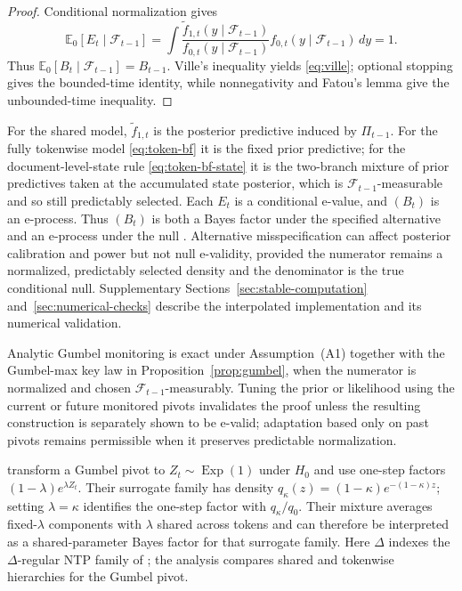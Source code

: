\documentclass[11pt]{article}
\newcommand{\E}{\mathbb E}
\newcommand{\F}{\mathcal F}
\begin{document}
\begin{proof}
Conditional normalization gives
\[
  \E_0[E_t\mid\F_{t-1}]
  =\int\frac{\widetilde f_{1,t}(y\mid\F_{t-1})}
  {f_{0,t}(y\mid\F_{t-1})}f_{0,t}(y\mid\F_{t-1})\,dy=1.
\]
Thus $\E_0[B_t\mid\F_{t-1}]=B_{t-1}$.  Ville's inequality yields \eqref{eq:ville}; optional stopping gives the bounded-time identity, while nonnegativity and Fatou's lemma give the unbounded-time inequality.
\end{proof}

For the shared model, $\widetilde f_{1,t}$ is the posterior predictive induced by $\Pi_{t-1}$.  For the fully tokenwise model \eqref{eq:token-bf} it is the fixed prior predictive; for the document-level-state rule \eqref{eq:token-bf-state} it is the two-branch mixture of prior predictives taken at the accumulated state posterior, which is $\F_{t-1}$-measurable and so still predictably selected.  Each $E_t$ is a conditional e-value, and $(B_t)$ is an e-process.  Thus $(B_t)$ is both a Bayes factor under the specified alternative and an e-process under the null \citep{shafer2011test,grunwald2024safe}.  Alternative misspecification can affect posterior calibration and power but not null e-validity, provided the numerator remains a normalized, predictably selected density and the denominator is the true conditional null.  Supplementary Sections~\ref{sec:stable-computation} and~\ref{sec:numerical-checks} describe the interpolated implementation and its numerical validation.

Analytic Gumbel monitoring is exact under Assumption~\textup{(A1)} together with the Gumbel-max key law in Proposition~\ref{prop:gumbel}, when the numerator is normalized and chosen $\F_{t-1}$-measurably.  Tuning the prior or likelihood using the current or future monitored pivots invalidates the proof unless the resulting construction is separately shown to be e-valid; adaptation based only on past pivots remains permissible when it preserves predictable normalization.

\citet[Sections~3.3--3.4]{luo2026rao} transform a Gumbel pivot to $Z_t\sim\operatorname{Exp}(1)$ under $H_0$ and use one-step factors $(1-\lambda)e^{\lambda Z_t}$.  Their surrogate family has density $q_\kappa(z)=(1-\kappa)e^{-(1-\kappa)z}$; setting $\lambda=\kappa$ identifies the one-step factor with $q_\kappa/q_0$.  Their mixture averages fixed-$\lambda$ components with $\lambda$ shared across tokens and can therefore be interpreted as a shared-parameter Bayes factor for that surrogate family.  Here $\Delta$ indexes the $\Delta$-regular NTP family of \citet{li2025framework}; the analysis compares shared and tokenwise hierarchies for the Gumbel pivot.
\end{document}
